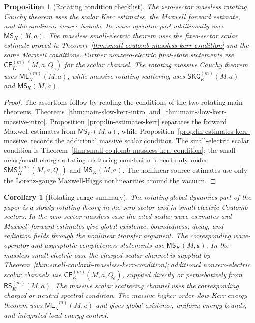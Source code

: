 \documentclass[11pt]{article}
\numberwithin{equation}{section}
\theoremstyle{plain}
\newtheorem{proposition}[theorem]{Proposition}
\newtheorem{corollary}[theorem]{Corollary}
\theoremstyle{definition}
\theoremstyle{remark}
\newcommand{\SKG}{\mathsf{SKG}}
\newcommand{\CElec}{\mathsf{CE}}
\newcommand{\RSLin}{\mathsf{RS}}
\newcommand{\ME}{\mathsf{ME}}
\newcommand{\MScat}{\mathsf{MS}}
\newcommand{\SMS}{\mathsf{SMS}}
\begin{document}
\begin{proposition}[Rotating condition checklist]\label{prop:no-hidden-charged-theorem}
The zero-sector massless rotating Cauchy theorem uses the scalar Kerr estimates, the Maxwell forward estimate, and the nonlinear source bounds.  Its wave-operator part additionally uses \(\MScat_K(M,a)\).  The massless small-electric theorem uses the fixed-sector scalar estimate proved in Theorem~\ref{thm:small-coulomb-massless-kerr-condition} and the same Maxwell conditions.  Further nonzero-electric final-state statements use \(\CElec^{(m)}_K(M,a,Q_e)\) for the scalar channel.  The rotating massive Cauchy theorem uses \(\ME^{(m)}_N(M,a)\), while massive rotating scattering uses \(\SKG^{(m)}_K(M,a)\) and \(\MScat_K(M,a)\).
\end{proposition}

\begin{proof}
The assertions follow by reading the conditions of the two rotating main theorems, Theorems~\ref{thm:main-slow-kerr-intro} and~\ref{thm:main-slow-kerr-massive-intro}.  Proposition~\ref{prop:lin-estimates-kerr} separates the forward Maxwell estimates from \(\MScat_K(M,a)\), while Proposition~\ref{prop:lin-estimates-kerr-massive} records the additional massive scalar condition.  The small-electric scalar condition is Theorem~\ref{thm:small-coulomb-massless-kerr-condition}; the small-mass/small-charge rotating scattering conclusion is read only under \(\SMS_K^{(m)}(M,a,Q_e)\) and \(\MScat_K(M,a)\).  The nonlinear source estimates use only the Lorenz-gauge Maxwell-Higgs nonlinearities around the vacuum.
\end{proof}

\begin{corollary}[Rotating range summary]\label{cor:strict-final-scope}
The rotating global-dynamics part of the paper is a slowly rotating theory in the zero sector and in small electric Coulomb sectors.  In the zero-sector massless case the cited scalar wave estimates and Maxwell forward estimates give global existence, boundedness, decay, and radiation fields through the nonlinear transfer argument.  The corresponding wave-operator and asymptotic-completeness statements use \(\MScat_K(M,a)\).  In the massless small-electric case the charged scalar channel is supplied by Theorem~\ref{thm:small-coulomb-massless-kerr-condition}; additional nonzero-electric scalar channels use \(\CElec^{(m)}_K(M,a,Q_e)\), supplied directly or perturbatively from \(\RSLin^{(m)}_K(M,a)\).  The massive scalar scattering channel uses the corresponding charged or neutral spectral condition.  The massive higher-order slow-Kerr energy theorem uses \(\ME^{(m)}_N(M,a)\) and gives global existence, uniform energy bounds, and integrated local energy control.
\end{corollary}
\end{document}

